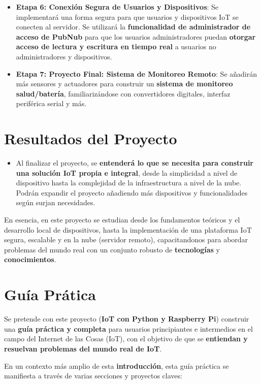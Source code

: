 \documentclass{report}
\begin{document}
\begin{itemize}
        \item \textbf{Etapa 6: Conexión Segura de Usuarios y Dispositivos}: Se implementará una forma segura para que usuarios y dispositivos IoT se 
              conecten al servidor. Se utilizará la \textbf{funcionalidad de administrador de acceso de PubNub} para que los usuarios administradores 
              puedan \textbf{otorgar acceso de lectura y escritura en tiempo real} a usuarios no administradores y dispositivos.
        \item \textbf{Etapa 7: Proyecto Final: Sistema de Monitoreo Remoto}: Se añadirán más sensores y actuadores para construir un 
              \textbf{sistema de monitoreo salud/batería}, familiarizándose con convertidores digitales, interfaz periférica serial y más.
    \end{itemize}

\section{Resultados del Proyecto}
    \begin{itemize}
        \item Al finalizar el proyecto, se \textbf{entenderá lo que se necesita para construir una solución IoT propia e integral}, desde la 
        simplicidad a nivel de dispositivo hasta la complejidad de la infraestructura a nivel de la nube. Podrán expandir el proyecto añadiendo más 
        dispositivos y funcionalidades según surjan necesidades.
    \end{itemize}

En esencia, en este proyecto se estudian desde los fundamentos teóricos y el desarrollo local de dispositivos, hasta 
la implementación de una plataforma IoT segura, escalable y en la nube (servidor remoto), capacitandonos para abordar problemas del mundo real con un
conjunto robusto de \textbf{tecnologías} y \textbf{conocimientos}.

\newpage
\section{Guía Prática}
Se pretende con este proyecto (\textbf{IoT con Python y Raspberry Pi}) construir una \textbf{guía práctica y completa} 
para usuarios principiantes e intermedios en el campo del Internet de las Cosas (IoT), con 
el objetivo de que se \textbf{entiendan y resuelvan problemas del mundo real de IoT}.

En un contexto más amplio de esta \textbf{introducción}, esta guía práctica se manifiesta a través de varias secciones 
y proyectos claves:
\end{document}
